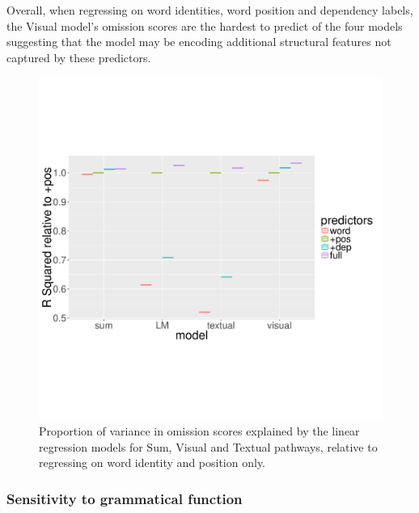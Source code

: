 Overall, when regressing on word identities, word position and
dependency labels, the {\sc Visual} model's omission scores are the
hardest to predict of the four models suggesting that the model may be
encoding additional structural features not captured by these
predictors.

\begin{figure}
\centering
  \includegraphics[scale=0.35]{position-new.pdf}
\caption{Proportion of variance in omission scores explained by the
  linear regression models
 for {\sc Sum}, {\sc Visual} and {\sc Textual} pathways, relative to
 regressing on word identity and position only. }
\label{fig:rsquared}
\end{figure}


\subsubsection{Sensitivity to grammatical function}
\label{sec:gramfunc}






